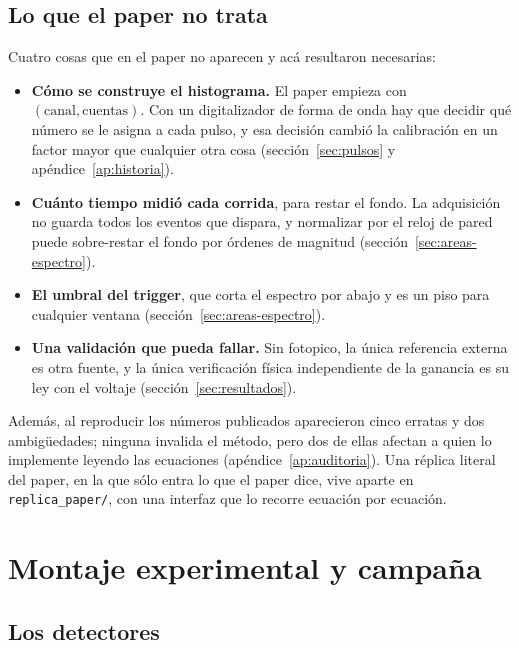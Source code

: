 \documentclass[11pt,a4paper]{article}
\begin{document}
\subsection{Lo que el paper no trata}
\propio

Cuatro cosas que en el paper no aparecen y acá resultaron necesarias:

\begin{itemize}
\item \textbf{Cómo se construye el histograma.} El paper empieza con
      $(\text{canal}, \text{cuentas})$. Con un digitalizador de forma de onda
      hay que decidir qué número se le asigna a cada pulso, y esa decisión
      cambió la calibración en un factor mayor que cualquier otra cosa
      (sección~\ref{sec:pulsos} y apéndice~\ref{ap:historia}).
\item \textbf{Cuánto tiempo midió cada corrida}, para restar el fondo. La
      adquisición no guarda todos los eventos que dispara, y normalizar por
      el reloj de pared puede sobre-restar el fondo por órdenes de magnitud
      (sección~\ref{sec:areas-espectro}).
\item \textbf{El umbral del trigger}, que corta el espectro por abajo y es un
      piso para cualquier ventana (sección~\ref{sec:areas-espectro}).
\item \textbf{Una validación que pueda fallar.} Sin fotopico, la única
      referencia externa es otra fuente, y la única verificación física
      independiente de la ganancia es su ley con el voltaje
      (sección~\ref{sec:resultados}).
\end{itemize}

\noindent
Además, al reproducir los números publicados aparecieron cinco erratas y dos
ambigüedades; ninguna invalida el método, pero dos de ellas
afectan a quien lo implemente leyendo las ecuaciones (apéndice~\ref{ap:auditoria}).
Una réplica literal del paper, en la que sólo entra lo que el paper dice,
vive aparte en \texttt{replica\_paper/}, con una interfaz que lo recorre
ecuación por ecuación.

\section{Montaje experimental y campaña}
\label{sec:montaje}
\label{sec:medido}

\subsection{Los detectores}
\end{document}
